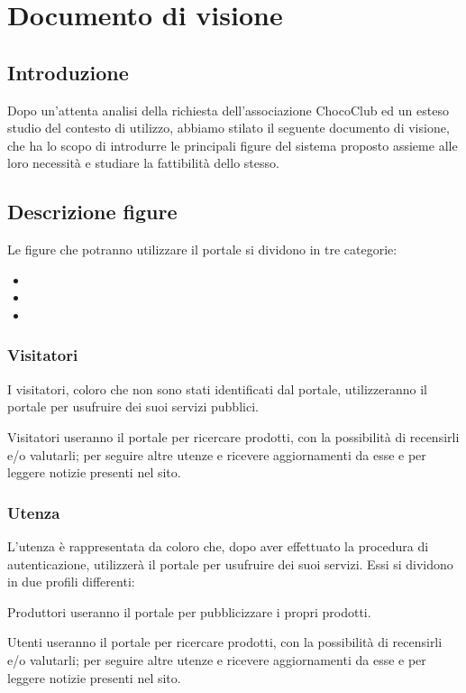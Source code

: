 \chapter{Documento di visione} 
\label{cha:documento_di_visione}

\section{Introduzione}
\label{sec:introduzione}
Dopo un'attenta analisi della richiesta dell'associazione ChocoClub ed un esteso studio del contesto di utilizzo, abbiamo stilato il seguente documento di visione, che ha lo scopo di introdurre le principali figure del sistema proposto assieme alle loro necessità e studiare la fattibilità dello stesso.

\section{Descrizione figure} 
\label{sec:descrizionefigure}
Le figure che potranno utilizzare il portale si dividono in tre categorie:
\begin{itemize}
	\item {}
	\item {}
	\item {}
\end{itemize}

\subsection{Visitatori} %
\label{sub:}
I visitatori, coloro che non sono stati identificati dal portale, utilizzeranno il portale per usufruire dei suoi servizi pubblici.
\begin{descriptionInd}
    \item[Visitatori] useranno il portale per ricercare prodotti, con la possibilità di recensirli e/o valutarli; per seguire altre utenze e ricevere aggiornamenti da esse e per leggere notizie presenti nel sito.
\end{descriptionInd}


\subsection{Utenza}
\label{sub:utenza}
L'utenza è rappresentata da coloro che, dopo aver effettuato la procedura di autenticazione, utilizzerà il portale per usufruire dei suoi servizi. Essi si dividono in due profili differenti:
\begin{descriptionInd}
    \item[Produttori] useranno il portale per pubblicizzare i propri prodotti.

    \item[Utenti] useranno il portale per ricercare prodotti, con la possibilità di recensirli e/o valutarli; per seguire altre utenze e ricevere aggiornamenti da esse e per leggere notizie presenti nel sito.
\end{descriptionInd}

